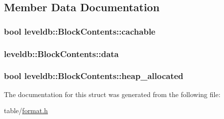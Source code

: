 \subsection{Member Data Documentation}
\hypertarget{structleveldb_1_1_block_contents_ad9cbcf81fb1378ce5f9a0db2e8d4b539}{}
\subsubsection[{cachable}]{\setlength{\rightskip}{0pt plus 5cm}bool leveldb\+::\+Block\+Contents\+::cachable}\label{structleveldb_1_1_block_contents_ad9cbcf81fb1378ce5f9a0db2e8d4b539}
\hypertarget{structleveldb_1_1_block_contents_aa30fe6388fe0f89d5565f6bae788c28e}{}
\subsubsection[{data}]{ leveldb\+::\+Block\+Contents\+::data}\label{structleveldb_1_1_block_contents_aa30fe6388fe0f89d5565f6bae788c28e}
\hypertarget{structleveldb_1_1_block_contents_a0d4390fa3d4041ac5a3da51cbb16e315}{}
\subsubsection[{heap\+\_\+allocated}]{\setlength{\rightskip}{0pt plus 5cm}bool leveldb\+::\+Block\+Contents\+::heap\+\_\+allocated}\label{structleveldb_1_1_block_contents_a0d4390fa3d4041ac5a3da51cbb16e315}


The documentation for this struct was generated from the following file\+:\begin{DoxyCompactItemize}
\item 
table/\hyperlink{format_8h}{format.\+h}\end{DoxyCompactItemize}
